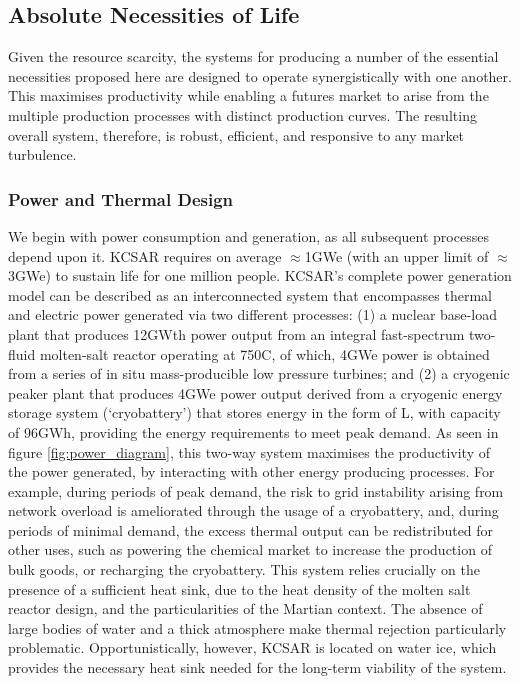 \documentclass[fleqn,10pt]{Stylesheet} %
\begin{document}
\subsection{Absolute Necessities of Life}

Given the resource scarcity, the systems for producing a number of the essential necessities proposed here are designed to operate synergistically with one another. This maximises productivity while enabling a futures market to arise from the multiple production processes with distinct production curves. The resulting overall system, therefore, is robust, efficient, and responsive to any market turbulence.

\subsubsection{Power and Thermal Design}
\label{sec:necessities_power}

We begin with power consumption and generation, as all subsequent processes depend upon it. KCSAR requires on average $\approx$1GWe (with an upper limit of $\approx$3GWe) to sustain life for one million people. KCSAR’s complete power generation model can be described as an interconnected system that encompasses thermal and electric power generated via two different processes: (1) a nuclear base-load plant that produces 12GWth power output from an integral fast-spectrum two-fluid molten-salt reactor operating at 750\degree{}C, of which, 4GWe power is obtained from a series of in situ mass-producible low pressure turbines; and (2) a cryogenic peaker plant that produces 4GWe power output derived from a cryogenic energy storage system (`cryobattery') that stores energy in the form of L, with capacity of 96GWh, providing the energy requirements to meet peak demand. As seen in figure \ref{fig:power_diagram}, this two-way system maximises the productivity of the power generated, by interacting with other energy producing processes. For example, during periods of peak demand, the risk to grid instability arising from network overload is ameliorated through the usage of a cryobattery, and, during periods of minimal demand, the excess thermal output can be redistributed for other uses, such as powering the chemical market to increase the production of bulk goods, or recharging the cryobattery. This system relies crucially on the presence of a sufficient heat sink, due to the heat density of the molten salt reactor design, and the particularities of the Martian context. The absence of large bodies of water and a thick atmosphere make thermal rejection particularly problematic. Opportunistically, however, KCSAR is located on water ice, which provides the necessary heat sink needed for the long-term viability of the system.
\end{document}
